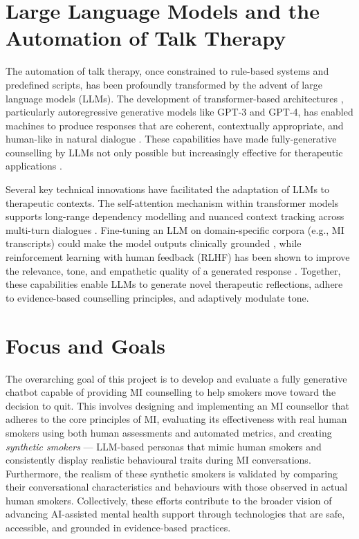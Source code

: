 \section{Large Language Models and the Automation of Talk Therapy}
The automation of talk therapy, once constrained to rule-based systems and predefined scripts, has been profoundly transformed by the advent of large language models (LLMs). The development of transformer-based architectures \cite{vaswani2017attention}, particularly autoregressive generative models like GPT-3 and GPT-4, has enabled machines to produce responses that are coherent, contextually appropriate, and human-like in natural dialogue \cite{openai2023gpt4}. These capabilities have made fully-generative counselling by LLMs not only possible but increasingly effective for therapeutic applications \cite{miner2020artificial, LEE2021856}.

Several key technical innovations have facilitated the adaptation of LLMs to therapeutic contexts. The self-attention mechanism within transformer models supports long-range dependency modelling and nuanced context tracking across multi-turn dialogues \cite{vaswani2017attention}. Fine-tuning an LLM on domain-specific corpora (e.g., MI transcripts) could make the model outputs clinically grounded \cite{kong2025llmtherapistssalespeopleevaluating}, while reinforcement learning with human feedback (RLHF) has been shown to improve the relevance, tone, and empathetic quality of a generated response \cite{10.5555/3600270.3602281}. Together, these capabilities enable LLMs to generate novel therapeutic reflections, adhere to evidence-based counselling principles, and adaptively modulate tone.



\section{Focus and Goals}
The overarching goal of this project is to develop and evaluate a fully generative chatbot capable of providing MI counselling to help smokers move toward the decision to quit. This involves designing and implementing an MI counsellor that adheres to the core principles of MI, evaluating its effectiveness with real human smokers using both human assessments and automated metrics, and creating \emph{synthetic smokers} --- LLM-based personas that mimic human smokers and consistently display realistic behavioural traits during MI conversations. Furthermore, the realism of these synthetic smokers is validated by comparing their conversational characteristics and behaviours with those observed in actual human smokers. Collectively, these efforts contribute to the broader vision of advancing AI-assisted mental health support through technologies that are safe, accessible, and grounded in evidence-based practices.

